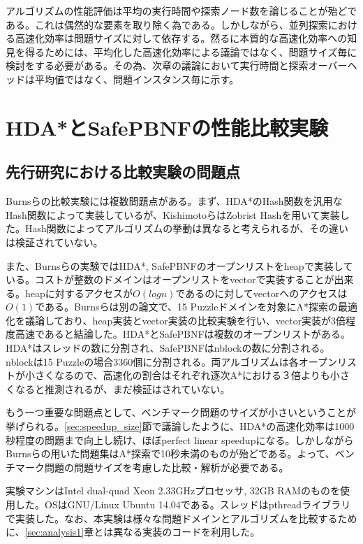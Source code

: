 \documentclass[uplatex]{jsarticle}
\begin{document}
アルゴリズムの性能評価は平均の実行時間や探索ノード数を論じることが殆どである。これは偶然的な要素を取り除く為である。しかしながら、並列探索における高速化効率は問題サイズに対して依存する。然るに本質的な高速化効率への知見を得るためには、平均化した高速化効率による議論ではなく、問題サイズ毎に検討をする必要がある。その為、次章の議論において実行時間と探索オーバーヘッドは平均値ではなく、問題インスタンス毎に示す。

\newpage

\section{HDA*とSafePBNFの性能比較実験}
\label{sec:analysis2}

\subsection{先行研究における比較実験の問題点}

Burnsらの比較実験には複数問題点がある\cite{Burns2010}。まず、HDA*のHash関数を汎用なHash関数によって実装しているが、KishimotoらはZobrist Hashを用いて実装した。Hash関数によってアルゴリズムの挙動は異なると考えられるが、その違いは検証されていない。

また、Burnsらの実験ではHDA*, SafePBNFのオープンリストをheapで実装している。コストが整数のドメインはオープンリストをvectorで実装することが出来る。heapに対するアクセスが$O(logn)$であるのに対してvectorへのアクセスは$O(1)$である。Burnsらは別の論文で、15 Puzzleドメインを対象にA*探索の最適化を議論しており、heap実装とvector実装の比較実験を行い、vector実装が3倍程度高速であると結論した\cite{Burns2012implementing}。HDA*とSafePBNFは複数のオープンリストがある。HDA*はスレッドの数に分割され、SafePBNFはnblockの数に分割される。nblockは15 Puzzleの場合3360個に分割される。両アルゴリズムは各オープンリストが小さくなるので、高速化の割合はそれぞれ逐次A*における３倍よりも小さくなると推測されるが、まだ検証はされていない。

もう一つ重要な問題点として、ベンチマーク問題のサイズが小さいということが挙げられる。\ref{sec:speedup_size}節で議論したように、HDA*の高速化効率は1000秒程度の問題まで向上し続け、ほぼperfect linear speedupになる。しかしながらBurnsらの用いた問題集はA*探索で10秒未満のものが殆どである。よって、ベンチマーク問題の問題サイズを考慮した比較・解析が必要である。
\newline

実験マシンはIntel dual-quad Xeon 2.33GHzプロセッサ, 32GB RAMのものを使用した。OSはGNU/Linux Ubuntu 14.04である。スレッドはpthreadライブラリで実装した。なお、本実験は様々な問題ドメインとアルゴリズムを比較するために、\ref{sec:analysis1}章とは異なる実装のコードを利用した。
\end{document}
